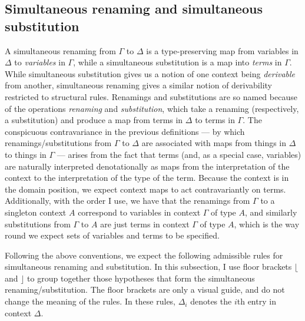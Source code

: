 \subsection{Simultaneous renaming and simultaneous substitution}

A simultaneous renaming from $\Gamma$ to $\Delta$ is a type-preserving map from
variables in $\Delta$ to \emph{variables} in $\Gamma$, while a simultaneous
substitution is a map into \emph{terms} in $\Gamma$.
While simultaneous substitution gives us a notion of one context being
\emph{derivable} from another, simultaneous renaming gives a similar notion
of derivability restricted to structural rules.
Renamings and substitutions are so named because of the operations
\emph{renaming} and \emph{substitution}, which take a renaming (respectively, a
substitution) and produce a map from terms in $\Delta$ to terms in $\Gamma$.
The conspicuous contravariance in the previous definitions --- by which
renamings/substitutions from $\Gamma$ to $\Delta$ are associated with maps from
things in $\Delta$ to things in $\Gamma$ --- arises from the fact that terms
(and, as a special case, variables) are naturally interpreted denotationally as
maps from the interpretation of the context to the interpretation of the type of
the term.
Because the context is in the domain position, we expect context maps to act
contravariantly on terms.
Additionally, with the order I use, we have that the renamings from $\Gamma$ to
a singleton context $A$ correspond to variables in context $\Gamma$ of type $A$,
and similarly substitutions from $\Gamma$ to $A$ are just terms in context
$\Gamma$ of type $A$, which is the way round we expect sets of variables and
terms to be specified.

Following the above conventions, we expect the following admissible rules for
simultaneous renaming and substitution.
In this subsection, I use floor brackets $\lfloor$ and $\rfloor$ to group
together those hypotheses that form the simultaneous renaming/substitution.
The floor brackets are only a visual guide, and do not change the meaning
of the rules.
In these rules, $\Delta_i$ denotes the $i$th entry in context $\Delta$.


